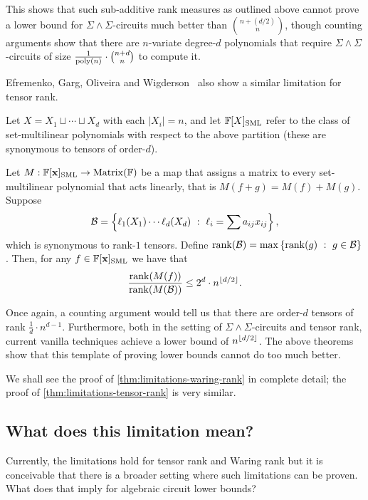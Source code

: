 This shows that such sub-additive rank measures as outlined above cannot prove a lower bound for $\Sigma\!\wedge\!\Sigma$-circuits much better than $\binom{n+(d/2)}{n}$, though counting arguments show that there are $n$-variate degree-$d$ polynomials that require $\Sigma\!\wedge\!\Sigma$-circuits of size $\frac{1}{\operatorname{poly}(n)} \cdot \binom{n+d}{n}$ to compute it.  

Efremenko, Garg, Oliveira and Wigderson~\cite{EGOW18} also show a similar limitation for tensor rank. 
\begin{theorem}\label{thm:limitations-tensor-rank}
  Let $X = X_1 \sqcup \cdots \sqcup X_d$ with each $|X_i| = n$, and let $\mathbb{F}[X]_{\text{SML}}$ refer to the class of set-multilinear polynomials with respect to the above partition (these are synonymous to tensors of order-$d$).
  
  Let $M: \mathbb{F}[\mathbf{x}]_{\text{SML}} \rightarrow \operatorname{Matrix}(\mathbb{F})$ be a map that assigns a matrix to every set-multilinear polynomial  that acts linearly, that is $M(f + g) = M(f) + M(g)$. Suppose
  \[\mathcal{B} = \left\{{\ell_1(X_1)\cdots \ell_d(X_d)}\ : \ {\ell_i = \sum a_{ij} x_{ij}}\right\},\]
  which is synonymous to rank-$1$ tensors. Define $\operatorname{rank}(\mathcal{B}) = \max\left\{{\operatorname{rank}(g)}\ : \ {g\in \mathcal{B}}\right\}$. Then, for any $f \in \mathbb{F}[\mathbf{x}]_{\text{SML}}$ we have that
  \[
    \frac{\operatorname{rank}(M(f))}{\operatorname{rank}(M(\mathcal{B}))} \leq 2^{d} \cdot  n^{\lfloor d/2 \rfloor}. 
  \]
\end{theorem}

Once again, a counting argument would tell us that there are order-$d$ tensors of rank $\frac{1}{d} \cdot n^{d-1}$. Furthermore, both in the setting of $\Sigma\!\wedge\!\Sigma$-circuits and tensor rank, current vanilla techniques achieve a lower bound of $n^{\lfloor d/2 \rfloor}$. The above theorems show that this template of proving lower bounds cannot do too much better. 


We shall see the proof of \autoref{thm:limitations-waring-rank} in complete detail; the proof of \autoref{thm:limitations-tensor-rank} is very similar. 

\subsection*{What does this limitation mean?}

Currently, the limitations hold for tensor rank and Waring rank but it is conceivable that there is a broader setting where such limitations can be proven. What does that imply for algebraic circuit lower bounds?

